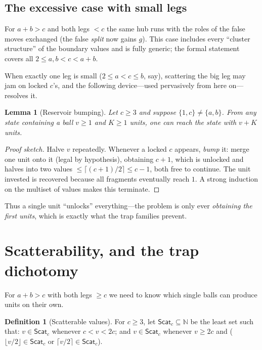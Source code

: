 \documentclass[11pt]{article}
\newtheorem{lemma}[theorem]{Lemma}
\theoremstyle{definition}
\newtheorem{definition}[theorem]{Definition}
\theoremstyle{remark}
\newcommand{\N}{\mathbb{N}}
\newcommand{\Scat}{\mathsf{Scat}}
\begin{document}
\subsection{The excessive case with small legs}

For $a+b>c$ and both legs $<c$ the same hub runs with the roles of the
false moves exchanged (the false \emph{split} now gains $g$).  This case
includes every ``cluster structure'' of the boundary values and is fully
generic; the formal statement covers all $2\le a,b<c<a+b$.

When exactly one leg is small ($2\le a<c\le b$, say), scattering the big leg
may jam on locked $c$'s, and the following device---used pervasively from
here on---resolves it.

\begin{lemma}[Reservoir bumping]\label{lem:bump}
Let $c\ge 3$ and suppose $\{1,c\}\ne\{a,b\}$.  From any state containing a
ball $v\ge 1$ and $K\ge 1$ units, one can reach the state with $v+K$
units.
\end{lemma}

\begin{proof}[Proof sketch]
Halve $v$ repeatedly.  Whenever a locked $c$ appears, \emph{bump} it: merge
one unit onto it (legal by hypothesis), obtaining $c+1$, which is unlocked
and halves into two values $\le\lceil (c+1)/2\rceil\le c-1$, both free to
continue.  The unit invested is recovered because all fragments eventually
reach $1$.  A strong induction on the multiset of values makes this
terminate.
\end{proof}

Thus a single unit ``unlocks'' everything---the problem is only ever
\emph{obtaining the first units}, which is exactly what the trap families
prevent.

\section{Scatterability, and the trap dichotomy}\label{sec:scat}

For $a+b>c$ with both legs $\ge c$ we need to know which single balls can
produce units on their own.

\begin{definition}[Scatterable values]\label{def:scat}
For $c\ge 3$, let $\Scat_c\subseteq\N$ be the least set such that:
$v\in\Scat_c$ whenever $c<v<2c$; and $v\in\Scat_c$ whenever $v\ge 2c$ and
($\lfloor v/2\rfloor\in\Scat_c$ or $\lceil v/2\rceil\in\Scat_c$).
\end{definition}
\end{document}
